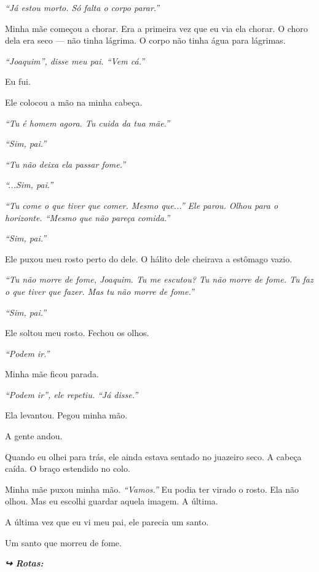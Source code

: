 \noindent \textit{\textquotedblleft{}Já estou morto. Só falta o corpo parar.\textquotedblright{}}

\noindent Minha mãe começou a chorar. Era a primeira vez que eu via ela chorar. O choro dela era seco --- não tinha lágrima. O corpo não tinha água para lágrimas.

\noindent \textit{\textquotedblleft{}Joaquim\textquotedblright{}\textit{, disse meu pai. }\textquotedblleft{}Vem cá.\textquotedblright{}}

\noindent Eu fui.

\noindent Ele colocou a mão na minha cabeça.

\noindent \textit{\textquotedblleft{}Tu é homem agora. Tu cuida da tua mãe.\textquotedblright{}}

\noindent \textit{\textquotedblleft{}Sim, pai.\textquotedblright{}}

\noindent \textit{\textquotedblleft{}Tu não deixa ela passar fome.\textquotedblright{}}

\noindent \textit{\textquotedblleft{}...Sim, pai.\textquotedblright{}}

\noindent \textit{\textquotedblleft{}Tu come o que tiver que comer. Mesmo que...\textquotedblright{}\textit{ Ele parou. Olhou para o horizonte. }\textquotedblleft{}Mesmo que não pareça comida.\textquotedblright{}}

\noindent \textit{\textquotedblleft{}Sim, pai.\textquotedblright{}}

\noindent Ele puxou meu rosto perto do dele. O hálito dele cheirava a estômago vazio.

\noindent \textit{\textquotedblleft{}Tu não morre de fome, Joaquim. Tu me escutou? Tu não morre de fome. Tu faz o que tiver que fazer. Mas tu não morre de fome.\textquotedblright{}}

\noindent \textit{\textquotedblleft{}Sim, pai.\textquotedblright{}}

\noindent Ele soltou meu rosto. Fechou os olhos.

\noindent \textit{\textquotedblleft{}Podem ir.\textquotedblright{}}

\noindent Minha mãe ficou parada.

\noindent \textit{\textquotedblleft{}Podem ir\textquotedblright{}\textit{, ele repetiu. }\textquotedblleft{}Já disse.\textquotedblright{}}

\noindent Ela levantou. Pegou minha mão.

\noindent A gente andou.

\noindent Quando eu olhei para trás, ele ainda estava sentado no juazeiro seco. A cabeça caída. O braço estendido no colo.

\noindent Minha mãe puxou minha mão. \textit{\textquotedblleft{}Vamos.\textquotedblright{}} Eu podia ter virado o rosto. Ela não olhou. Mas eu escolhi guardar aquela imagem. A última.

\noindent A última vez que eu vi meu pai, ele parecia um santo.

\noindent Um santo que morreu de fome.

\vspace{0.5em}
\noindent\textit{\textbf{↪ Rotas:}  \rotasep {} \rotasep {}}